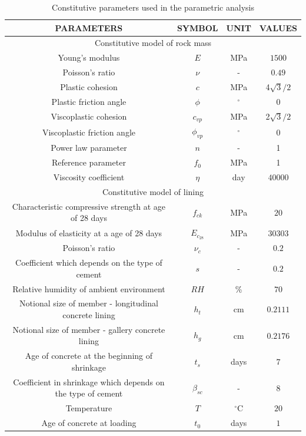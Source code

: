 \documentclass[a4paper,fleqn]{cas-sc}
\begin{document}
\begin{table}[h!]
	\caption{Constitutive parameters used in the parametric analysis}
	\label{table2}
	\centering
	\renewcommand{\arraystretch}{1.25}
	\begin{tabular}{c c c c}
		\hline
		\multicolumn{1}{c}{PARAMETERS} &
		\multicolumn{1}{c}{SYMBOL} &
		\multicolumn{1}{c}{UNIT} &
		\multicolumn{1}{c}{VALUES} \\
		\hline
		\multicolumn{4}{c}{Constitutive model of rock mass} \\
		\hline
		Young's modulus & $E$ & MPa & $1500$ \\
		Poisson's ratio & $\nu$ & - & $0.49$ \\
		Plastic cohesion & $c$ & MPa & 4$\sqrt{3}/2$ \\
		Plastic friction angle & $\phi$ & $^{\circ}$ & 0 \\
		Viscoplastic cohesion & $c_{vp}$ & MPa & 2$\sqrt{3}/2$ \\
		Viscoplastic friction angle & $\phi_{vp}$ & $^{\circ}$ & 0 \\
		Power law parameter & $n$ & - & 1 \\
		Reference parameter & $f_0$ & MPa & 1 \\
		Viscosity coefficient & $\eta$ & day & $40000$ \\
		\hline
		\multicolumn{4}{c}{Constitutive model of lining} \\
		\hline
		
		Characteristic compressive strength at age of 28 days & $f_{ck}$ & MPa & $20$ \\
		Modulus of elasticity at a age of 28 days & $E_{c_{28}}$ & MPa & $30303$ \\
		Poisson's ratio & $\nu_c$ & - & $0.2$ \\
		
		Coefficient which depends on the type of cement & $s$ & - & $0.2$ \\
		Relative humidity of ambient environment & $RH$ & \% & $70$ \\
		Notional size of member - longitudinal concrete lining & $h_t$ & cm & $0.2111$ \\
		Notional size of member - gallery concrete lining & $h_{g}$ & cm & $0.2176$ \\
		Age of concrete at the beginning of shrinkage & $t_s$ & days & $7$ \\
		Coefficient in shrinkage which depends on the type of cement & $\beta_{sc}$ & - & $8$ \\
		Temperature & $T$ & $^\circ$C & $20$ \\
		Age of concrete at loading & $t_0$ & days & $1$ \\
		\hline
	\end{tabular}
	\normalsize
\end{table}
\FloatBarrier
\end{document}
